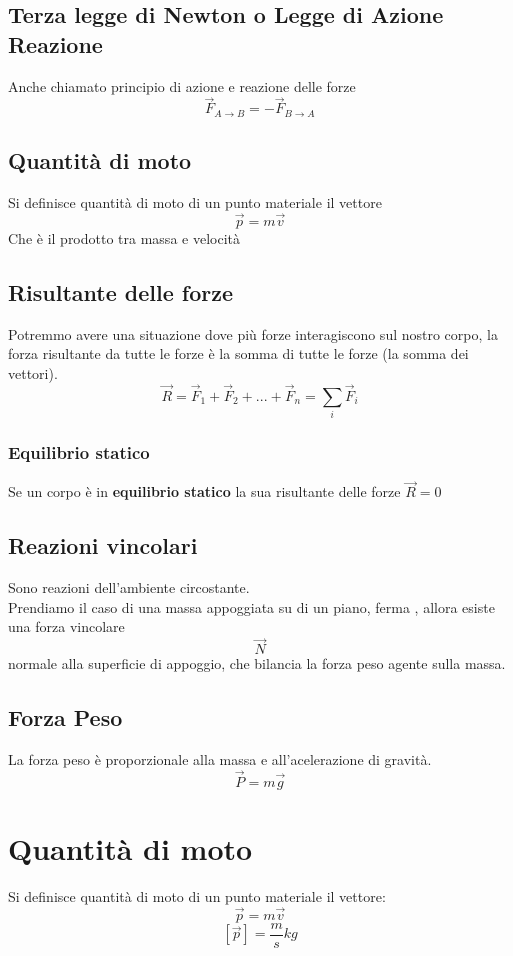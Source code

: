 \documentclass[a4paper]{report}
\begin{document}
  \subsection{Terza legge di Newton o Legge di Azione Reazione}
  Anche chiamato principio di azione e reazione delle forze
  $$ \vec{F}_{A \rightarrow B} = -\vec{F}_{B \rightarrow A} $$

  \subsection{Quantità di moto}
  Si definisce quantità di moto di un punto materiale il vettore
  $$ \vec{p} = m\vec{v} $$
  Che è il prodotto tra massa e velocità

  \subsection{Risultante delle forze}
  Potremmo avere una situazione dove più forze interagiscono sul nostro corpo, la forza risultante da tutte le forze è la somma di tutte le forze (la somma dei vettori).
  $$ \vec{R} = \vec{F}_1 + \vec{F}_2 + ... +\vec{F}_n = \sum_i \vec{F}_i $$

  \subsubsection{Equilibrio statico}
  Se un corpo è in \textbf{equilibrio statico} la sua risultante delle forze $\vec{R} = 0$

  \subsection{Reazioni vincolari}
  Sono reazioni dell'ambiente circostante.\\
  Prendiamo il caso di una massa appoggiata su di un piano, ferma , allora esiste una forza vincolare
  $$ \vec{N} $$
  normale alla superficie di appoggio, che bilancia la forza peso agente sulla massa.

  \subsection{Forza Peso}
  La forza peso è proporzionale alla massa e all'acelerazione di gravità.
  $$ \vec{P} = m\vec{g} $$

  \section{Quantità di moto}
  Si definisce quantità di moto di un punto materiale il vettore:
  $$ \vec{p} = m \vec{v} $$
  $$ [\vec{p}] = \frac{m}{s} kg $$
\end{document}
